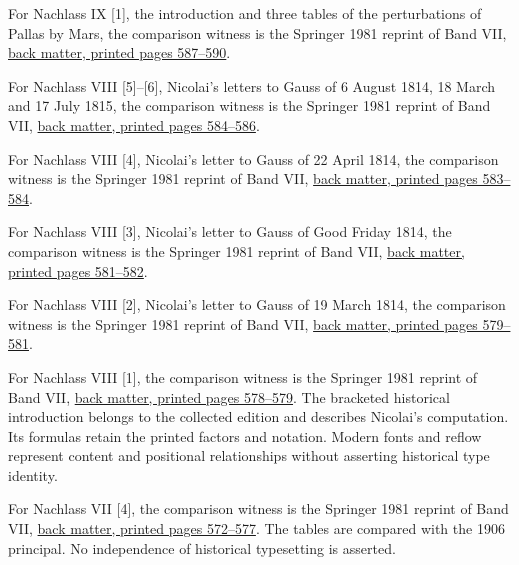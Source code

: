 For Nachlass IX [1], the introduction and three tables of the perturbations of Pallas by Mars, the comparison witness is the Springer 1981 reprint of Band VII, \href{https://link.springer.com/content/pdf/bbm:978-3-642-92478-1/1}{back matter, printed pages 587--590}.



For Nachlass VIII [5]--[6], Nicolai's letters to Gauss of 6 August 1814, 18 March and 17 July 1815, the comparison witness is the Springer 1981 reprint of Band VII, \href{https://link.springer.com/content/pdf/bbm:978-3-642-92478-1/1}{back matter, printed pages 584--586}.



For Nachlass VIII [4], Nicolai's letter to Gauss of 22 April 1814, the comparison witness is the Springer 1981 reprint of Band VII, \href{https://link.springer.com/content/pdf/bbm:978-3-642-92478-1/1}{back matter, printed pages 583--584}.



For Nachlass VIII [3], Nicolai's letter to Gauss of Good Friday 1814, the comparison witness is the Springer 1981 reprint of Band VII, \href{https://link.springer.com/content/pdf/bbm:978-3-642-92478-1/1}{back matter, printed pages 581--582}.



For Nachlass VIII [2], Nicolai's letter to Gauss of 19 March 1814, the comparison witness is the Springer 1981 reprint of Band VII, \href{https://link.springer.com/content/pdf/bbm:978-3-642-92478-1/1}{back matter, printed pages 579--581}.



For Nachlass VIII [1], the comparison witness is the Springer 1981 reprint of Band VII, \href{https://link.springer.com/content/pdf/bbm:978-3-642-92478-1/1}{back matter, printed pages 578--579}. The bracketed historical introduction belongs to the collected edition and describes Nicolai's computation. Its formulas retain the printed factors and notation. Modern fonts and reflow represent content and positional relationships without asserting historical type identity.



For Nachlass VII [4], the comparison witness is the Springer 1981 reprint of Band VII, \href{https://link.springer.com/content/pdf/bbm:978-3-642-92478-1/1}{back matter, printed pages 572--577}. The tables are compared with the 1906 principal. No independence of historical typesetting is asserted.



